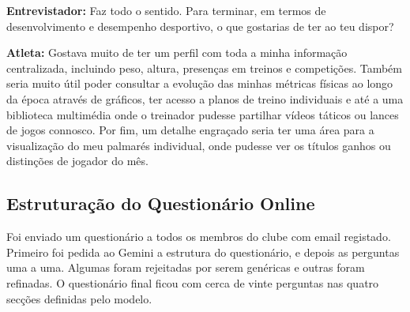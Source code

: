 \begin{tcolorbox}[colback=white, colframe=gray!50, arc=1mm, title=\textbf{Transcrição da Entrevista ao Atleta}]
\textbf{Entrevistador:} Faz todo o sentido. Para terminar, em termos de desenvolvimento e desempenho desportivo, o que gostarias de ter ao teu dispor?

\textbf{Atleta:} Gostava muito de ter um perfil com toda a minha informação centralizada, incluindo peso, altura, presenças em treinos e competições. Também seria muito útil poder consultar a evolução das minhas métricas físicas ao longo da época através de gráficos, ter acesso a planos de treino individuais e até a uma biblioteca multimédia onde o treinador pudesse partilhar vídeos táticos ou lances de jogos connosco. Por fim, um detalhe engraçado seria ter uma área para a visualização do meu palmarés individual, onde pudesse ver os títulos ganhos ou distinções de jogador do mês.
\end{tcolorbox}

\subsection{Estruturação do Questionário Online}\label{sec:ia_questionario}

Foi enviado um questionário a todos os membros do clube com email registado. Primeiro foi pedida ao Gemini a estrutura do questionário, e depois as perguntas uma a uma. Algumas foram rejeitadas por serem genéricas e outras foram refinadas. O questionário final ficou com cerca de vinte perguntas nas quatro secções definidas pelo modelo.

